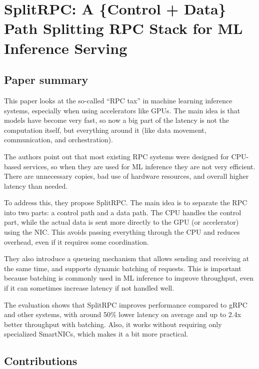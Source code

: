 \documentclass[a4paper, 12pt]{article}
\begin{document}
\section*{SplitRPC: A \{Control + Data\} Path Splitting RPC Stack for ML Inference Serving}
\subsection{Paper summary}

This paper looks at the so-called “RPC tax” in machine learning inference systems, especially when using accelerators like GPUs. The main idea is that models have become very fast, so now a big part of the latency is not the computation itself, but everything around it (like data movement, communication, and orchestration).

The authors point out that most existing RPC systems were designed for CPU-based services, so when they are used for ML inference they are not very efficient. There are unnecessary copies, bad use of hardware resources, and overall higher latency than needed.

To address this, they propose SplitRPC. The main idea is to separate the RPC into two parts: a control path and a data path. The CPU handles the control part, while the actual data is sent more directly to the GPU (or accelerator) using the NIC. This avoids passing everything through the CPU and reduces overhead, even if it requires some coordination.

They also introduce a queueing mechanism that allows sending and receiving at the same time, and supports dynamic batching of requests. This is important because batching is commonly used in ML inference to improve throughput, even if it can sometimes increase latency if not handled well.

The evaluation shows that SplitRPC improves performance compared to gRPC and other systems, with around 50\% lower latency on average and up to 2.4x better throughput with batching. Also, it works without requiring only specialized SmartNICs, which makes it a bit more practical.

\subsection{Contributions}
\end{document}
